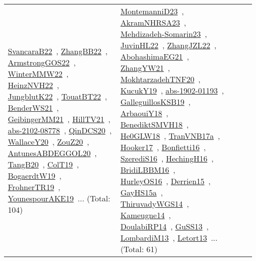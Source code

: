 {\begin{longtable}{lp{3cm}>{\raggedright\arraybackslash}p{6cm}>{\raggedright\arraybackslash}p{6cm}>{\raggedright\arraybackslash}p{8cm}}
\href{works/SvancaraB22.pdf}{SvancaraB22}~\cite{SvancaraB22}, \href{works/ZhangBB22.pdf}{ZhangBB22}~\cite{ZhangBB22}, \href{works/ArmstrongGOS22.pdf}{ArmstrongGOS22}~\cite{ArmstrongGOS22}, \href{works/WinterMMW22.pdf}{WinterMMW22}~\cite{WinterMMW22}, \href{works/HeinzNVH22.pdf}{HeinzNVH22}~\cite{HeinzNVH22}, \href{works/JungblutK22.pdf}{JungblutK22}~\cite{JungblutK22}, \href{works/TouatBT22.pdf}{TouatBT22}~\cite{TouatBT22}, \href{works/BenderWS21.pdf}{BenderWS21}~\cite{BenderWS21}, \href{works/GeibingerMM21.pdf}{GeibingerMM21}~\cite{GeibingerMM21}, \href{works/HillTV21.pdf}{HillTV21}~\cite{HillTV21}, \href{works/abs-2102-08778.pdf}{abs-2102-08778}~\cite{abs-2102-08778}, \href{works/QinDCS20.pdf}{QinDCS20}~\cite{QinDCS20}, \href{works/WallaceY20.pdf}{WallaceY20}~\cite{WallaceY20}, \href{works/ZouZ20.pdf}{ZouZ20}~\cite{ZouZ20}, \href{works/AntunesABDEGGOL20.pdf}{AntunesABDEGGOL20}~\cite{AntunesABDEGGOL20}, \href{works/TangB20.pdf}{TangB20}~\cite{TangB20}, \href{works/ColT19.pdf}{ColT19}~\cite{ColT19}, \href{works/BogaerdtW19.pdf}{BogaerdtW19}~\cite{BogaerdtW19}, \href{works/FrohnerTR19.pdf}{FrohnerTR19}~\cite{FrohnerTR19}, \href{works/YounespourAKE19.pdf}{YounespourAKE19}~\cite{YounespourAKE19}... (Total: 104) & \href{works/MontemanniD23.pdf}{MontemanniD23}~\cite{MontemanniD23}, \href{works/AkramNHRSA23.pdf}{AkramNHRSA23}~\cite{AkramNHRSA23}, \href{works/Mehdizadeh-Somarin23.pdf}{Mehdizadeh-Somarin23}~\cite{Mehdizadeh-Somarin23}, \href{works/JuvinHL22.pdf}{JuvinHL22}~\cite{JuvinHL22}, \href{works/ZhangJZL22.pdf}{ZhangJZL22}~\cite{ZhangJZL22}, \href{works/AbohashimaEG21.pdf}{AbohashimaEG21}~\cite{AbohashimaEG21}, \href{works/ZhangYW21.pdf}{ZhangYW21}~\cite{ZhangYW21}, \href{works/MokhtarzadehTNF20.pdf}{MokhtarzadehTNF20}~\cite{MokhtarzadehTNF20}, \href{works/KucukY19.pdf}{KucukY19}~\cite{KucukY19}, \href{works/abs-1902-01193.pdf}{abs-1902-01193}~\cite{abs-1902-01193}, \href{works/GalleguillosKSB19.pdf}{GalleguillosKSB19}~\cite{GalleguillosKSB19}, \href{works/ArbaouiY18.pdf}{ArbaouiY18}~\cite{ArbaouiY18}, \href{works/BenediktSMVH18.pdf}{BenediktSMVH18}~\cite{BenediktSMVH18}, \href{works/He0GLW18.pdf}{He0GLW18}~\cite{He0GLW18}, \href{works/TranVNB17a.pdf}{TranVNB17a}~\cite{TranVNB17a}, \href{works/Hooker17.pdf}{Hooker17}~\cite{Hooker17}, \href{works/Bonfietti16.pdf}{Bonfietti16}~\cite{Bonfietti16}, \href{works/SzerediS16.pdf}{SzerediS16}~\cite{SzerediS16}, \href{works/HechingH16.pdf}{HechingH16}~\cite{HechingH16}, \href{works/BridiLBBM16.pdf}{BridiLBBM16}~\cite{BridiLBBM16}, \href{works/HurleyOS16.pdf}{HurleyOS16}~\cite{HurleyOS16}, \href{works/Derrien15.pdf}{Derrien15}~\cite{Derrien15}, \href{works/GayHS15a.pdf}{GayHS15a}~\cite{GayHS15a}, \href{works/ThiruvadyWGS14.pdf}{ThiruvadyWGS14}~\cite{ThiruvadyWGS14}, \href{works/Kameugne14.pdf}{Kameugne14}~\cite{Kameugne14}, \href{works/DoulabiRP14.pdf}{DoulabiRP14}~\cite{DoulabiRP14}, \href{works/GuSS13.pdf}{GuSS13}~\cite{GuSS13}, \href{works/LombardiM13.pdf}{LombardiM13}~\cite{LombardiM13}, \href{works/Letort13.pdf}{Letort13}~\cite{Letort13}... (Total: 61)\\

\end{longtable}}
